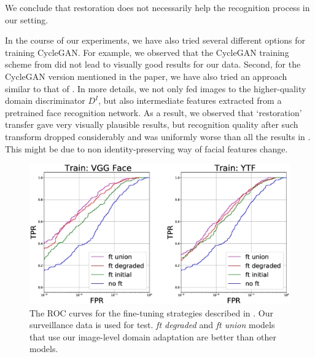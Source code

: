 We conclude that restoration does not necessarily help the recognition process in our setting. 

In the course of our experiments, we have also tried several different options for training CycleGAN. For example, we observed that the CycleGAN training scheme from \citep{ZhuPIE17} did not lead to visually good results for our data. Second, for the CycleGAN version mentioned in the paper, we have also tried an approach similar to that of \citep{sungatullina2018image}. In more details, we not only fed images to the higher-quality domain discriminator  $D^{I}$, but also intermediate features extracted from a pretrained face recognition network. As a result, we observed that ‘restoration’ transfer gave very visually plausible results, but recognition quality after such transform dropped considerably and was uniformly worse than all the results in . This might be due to non identity-preserving way of facial features change.


  
  \begin{figure}

  \centering
    \includegraphics[width=\linewidth]{Chapters/facev1/Fig5.eps}
    \caption{The ROC curves for the fine-tuning strategies described in . Our surveillance data is used for test. \textit{ft degraded} and \textit{ft union} models that use our image-level domain adaptation are better than other models. }\label{fig:roc_oxford_ytube}
  \end{figure}
  
